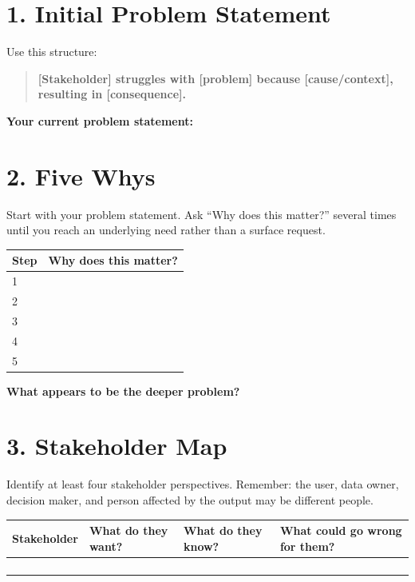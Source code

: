 \documentclass[11pt]{article}
\newcommand{\writearea}[1]{%
\vspace{0.2em}
\fbox{\parbox[t][#1][t]{0.97\textwidth}{\vspace{0.3em}}}
}
\begin{document}
\section*{1. Initial Problem Statement}

Use this structure:

\begin{quote}
\textbf{[Stakeholder] struggles with [problem] because [cause/context], resulting in [consequence].}
\end{quote}

\textbf{Your current problem statement:}

\writearea{1.1in}

\section*{2. Five Whys}

Start with your problem statement. Ask ``Why does this matter?'' several times until you reach an underlying need rather than a surface request.

\begin{center}
\begin{tabularx}{\textwidth}{p{} X}
\toprule
\textbf{Step} & \textbf{Why does this matter?} \\
\midrule
1 & \\[0.35in]
2 & \\[0.35in]
3 & \\[0.35in]
4 & \\[0.35in]
5 & \\[0.35in]
\bottomrule
\end{tabularx}
\end{center}

\textbf{What appears to be the deeper problem?}

\writearea{0.8in}

\section*{3. Stakeholder Map}

Identify at least four stakeholder perspectives. Remember: the user, data owner, decision maker, and person affected by the output may be different people.

\begin{center}
\begin{tabularx}{\textwidth}{p{} X X X}
\toprule
\textbf{Stakeholder} & \textbf{What do they want?} & \textbf{What do they know?} & \textbf{What could go wrong for them?} \\
\midrule
 & & & \\[0.55in]
 & & & \\[0.55in]
 & & & \\[0.55in]
 & & & \\[0.55in]
\bottomrule
\end{tabularx}
\end{center}
\end{document}
